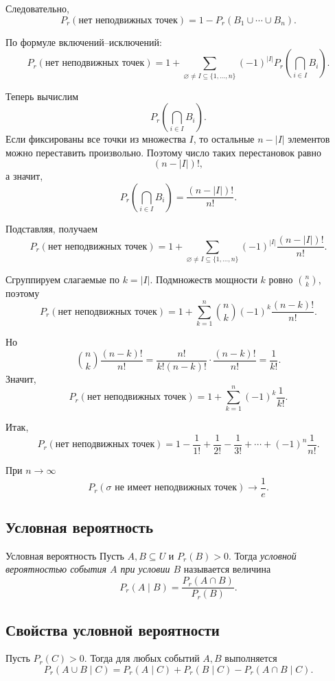 Следовательно,
\[
P_r(\text{нет неподвижных точек})
=
1-P_r(B_1\cup\cdots\cup B_n).
\]

По формуле включений--исключений:
\[
P_r(\text{нет неподвижных точек})
=
1+
\sum_{\varnothing\neq I\subseteq \{1,\dots,n\}}
(-1)^{|I|}
P_r\!\left(\bigcap_{i\in I} B_i\right).
\]

Теперь вычислим
\[
P_r\!\left(\bigcap_{i\in I} B_i\right).
\]
Если фиксированы все точки из множества \(I\), то остальные \(n-|I|\) элементов можно переставить произвольно. Поэтому число таких перестановок равно
\[
(n-|I|)!,
\]
а значит,
\[
P_r\!\left(\bigcap_{i\in I} B_i\right)
=
\frac{(n-|I|)!}{n!}.
\]

Подставляя, получаем
\[
P_r(\text{нет неподвижных точек})
=
1+
\sum_{\varnothing\neq I\subseteq \{1,\dots,n\}}
(-1)^{|I|}
\frac{(n-|I|)!}{n!}.
\]

Сгруппируем слагаемые по \(k=|I|\). Подмножеств мощности \(k\) ровно \(\binom{n}{k}\), поэтому
\[
P_r(\text{нет неподвижных точек})
=
1+\sum_{k=1}^n \binom{n}{k}(-1)^k\frac{(n-k)!}{n!}.
\]

Но
\[
\binom{n}{k}\frac{(n-k)!}{n!}
=
\frac{n!}{k!(n-k)!}\cdot \frac{(n-k)!}{n!}
=
\frac1{k!}.
\]
Значит,
\[
P_r(\text{нет неподвижных точек})
=
1+\sum_{k=1}^n (-1)^k\frac1{k!}.
\]

Итак,
\[
P_r(\text{нет неподвижных точек})
=
1-\frac1{1!}+\frac1{2!}-\frac1{3!}+\cdots+(-1)^n\frac1{n!}.
\]

\begin{Remark}{}{}
При \(n\to\infty\)
\[
P_r(\sigma \text{ не имеет неподвижных точек})
\longrightarrow
\frac1e.
\]
\end{Remark}

\subsection{Условная вероятность}

\begin{Definition}{Условная вероятность}{}
	Пусть \(A,B\subseteq U\) и \(P_r(B)>0\). Тогда \textit{условной вероятностью события \(A\) при условии \(B\)} называется величина
	\[
	P_r(A\mid B)=\frac{P_r(A\cap B)}{P_r(B)}.
	\]
\end{Definition}

\subsection*{Свойства условной вероятности}

\begin{Statement}{}{}
	Пусть \(P_r(C)>0\). Тогда для любых событий \(A,B\) выполняется
	\[
	P_r(A\cup B\mid C)
	=
	P_r(A\mid C)+P_r(B\mid C)-P_r(A\cap B\mid C).
	\]
\end{Statement}

